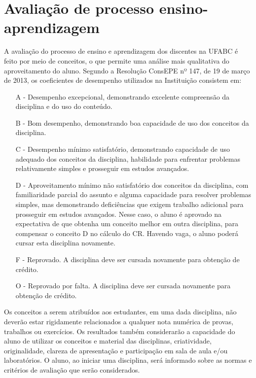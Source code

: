 \section{Avaliação de processo ensino-aprendizagem}

A avaliação do processo de ensino e aprendizagem dos discentes na UFABC é feito
por meio de conceitos, o que permite uma análise mais qualitativa do
aproveitamento do aluno.
Segundo a Resolução ConsEPE nº 147, de 19 de março de 2013, os coeficientes de
desempenho utilizados na Instituição consistem em:
\begin{itemize}
    \item [A -] Desempenho excepcional, demonstrando excelente compreensão da
    disciplina e do uso do conteúdo.
    \item [B -] Bom desempenho, demonstrando boa capacidade de uso dos
    conceitos da disciplina.
    \item [C -] Desempenho mínimo satisfatório, demonstrando capacidade de uso
    adequado dos conceitos da disciplina, habilidade para enfrentar problemas
    relativamente simples e prosseguir em estudos avançados.
    \item[D -] Aproveitamento mínimo não satisfatório dos conceitos da
    disciplina, com familiaridade parcial do assunto e alguma capacidade para
    resolver problemas simples, mas demonstrando deficiências que exigem
    trabalho adicional para prosseguir em estudos avançados. Nesse caso, o
    aluno é aprovado na expectativa de que obtenha um conceito melhor em outra
    disciplina, para compensar o conceito D no cálculo do CR. Havendo vaga, o
    aluno poderá cursar esta disciplina novamente.
    \item [F -] Reprovado. A disciplina deve ser cursada novamente para
    obtenção de crédito.
    \item [O -] Reprovado por falta. A disciplina deve ser cursada novamente
    para obtenção de crédito.
\end{itemize}

Os conceitos a serem atribuídos aos estudantes, em uma dada disciplina, não
deverão estar rigidamente relacionados a qualquer nota numérica de provas,
trabalhos ou exercícios.
Os resultados também considerarão a capacidade do aluno de utilizar os
conceitos e material das disciplinas, criatividade, originalidade, clareza de
apresentação e participação em sala de aula e/ou laboratórios. 
O aluno, ao iniciar uma disciplina, será informado sobre as normas e critérios
de avaliação que serão considerados.


